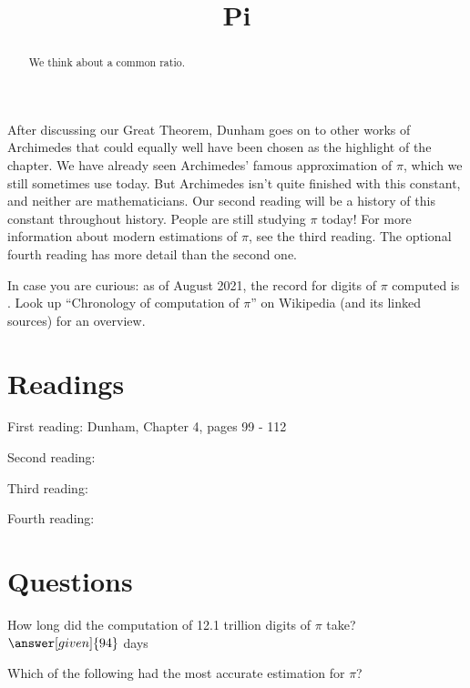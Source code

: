 \documentclass{ximera}
\title{Pi}
\begin{document}
\begin{abstract}
  We think about a common ratio.    
\end{abstract}
\maketitle

After discussing our Great Theorem, Dunham goes on to other works of Archimedes that could equally well have been chosen as the highlight of the chapter.   We have already seen Archimedes' famous approximation of $\pi$, which we still sometimes use today. But Archimedes isn't quite finished with this constant, and neither are mathematicians.  Our second reading will be a history of this constant throughout history.  People are still studying $\pi$ today!  For more information about modern estimations of $\pi$, see the third reading.  The optional fourth reading has more detail than the second one.

In case you are curious: as of August 2021, the record for digits of $\pi$ computed is .  Look up ``Chronology of computation of $\pi$'' on Wikipedia (and its linked sources) for an overview.


\section{Readings}
First reading: Dunham, Chapter 4, pages 99 - 112

Second reading: 

Third reading: 

Fourth reading: 

\section{Questions}

\begin{question}
How long did the computation of 12.1 trillion digits of $\pi$ take? $\answer[given]{94}$ days
\end{question}

\begin{question}
Which of the following had the most accurate estimation for $\pi$?
\begin{multipleChoice}
\end{multipleChoice}
\end{question}
\end{document}

